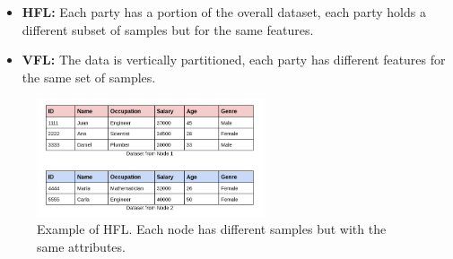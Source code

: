 \begin{itemize}
    \item \textbf{HFL:} Each party has a portion of the overall dataset, each party holds a different subset of samples but for the same features.
    \item \textbf{VFL:} The data  is vertically partitioned, each party has different features for the same set of samples.
\end{itemize}

\begin{figure}[H]
  \centering
  \includegraphics[width=0.6\textwidth]{figures/2-Federated_Learning/HFL.png}
  \caption{Example of HFL. Each node has different samples but with the same attributes.}
  \label{fig:HFL}
\end{figure}

